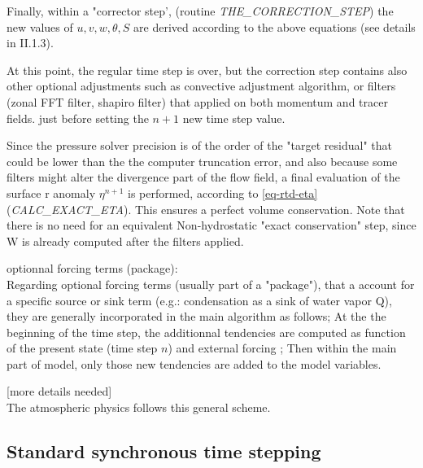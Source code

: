 Finally, within a "corrector step', 
(routine {\it THE\_CORRECTION\_STEP})
the new values of $u,v,w,\theta,S$ 
are derived according to the above equations
(see details in II.1.3). 

At this point, the regular time step is over, but  
the correction step contains also other optional
adjustments such as convective adjustment algorithm, or filters 
(zonal FFT filter, shapiro filter)
that applied on both momentum and tracer fields.
just before setting the $n+1$ new time step value.

Since the pressure solver precision is of the order of
the "target residual" that could be lower than the 
the computer truncation error, and also because some filters 
might alter the divergence part of the flow field,
a final evaluation of the surface r anomaly $\eta^{n+1}$
is performed, according to \ref{eq-rtd-eta} ({\it CALC\_EXACT\_ETA}).
This ensures a perfect volume conservation.
Note that there is no need for an equivalent Non-hydrostatic
"exact conservation" step, since W is already computed after 
the filters applied.

optionnal forcing terms (package):\\
Regarding optional forcing terms (usually part of a "package"), 
that a account for a specific source or sink term (e.g.: condensation
as a sink of water vapor Q), they are generally incorporated 
in the main algorithm as follows;
At the the beginning of the time step,
the additionnal tendencies are computed
as function of the present state (time step $n$) and external forcing ;
Then within the main part of model,
only those new tendencies are added to the model variables.

[more details needed]\\
The atmospheric physics follows this general scheme.

\subsection{Standard synchronous time stepping}

